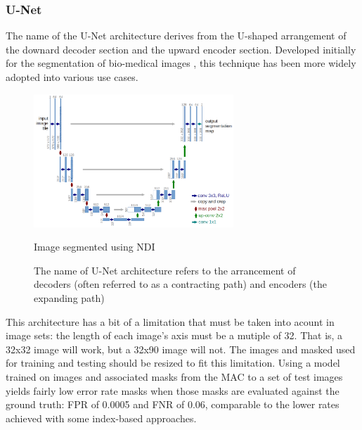 \documentclass[letterpaper]{article}
\begin{document}
{\subsubsection{U-Net}
The name of the U-Net architecture derives from the U-shaped arrangement of the downard decoder section and the upward encoder section. Developed initially for the segmentation of bio-medical images \parencite{Ronneberger2015-ye}, this technique has been more widely adopted into various use cases.

\begin{figure}[H]
	\centering
	\includegraphics[height=5cm]{./figures/u-net-architecture.png}
	\caption{Image segmented using NDI}
	\label{fig:u-net}
	\caption[U-Net architecture]{The name of U-Net architecture refers to the arrancement of decoders (often referred to as a contracting path) and encoders (the expanding path)}
\end{figure}
This architecture has a bit of a limitation that must be taken into acount in image sets: the length of each image's axis must be a mutiple of 32. That is, a 32x32 image will work, but a 32x90 image will not. The images and masked used for training and testing should be resized to fit this limitation. Using a model trained on images and associated masks from the MAC to a set of test images yields fairly low error rate masks when  those masks are evaluated against the ground truth: FPR of 0.0005 and FNR of 0.06, comparable to the lower rates achieved with some index-based approaches.

}
\end{document}
